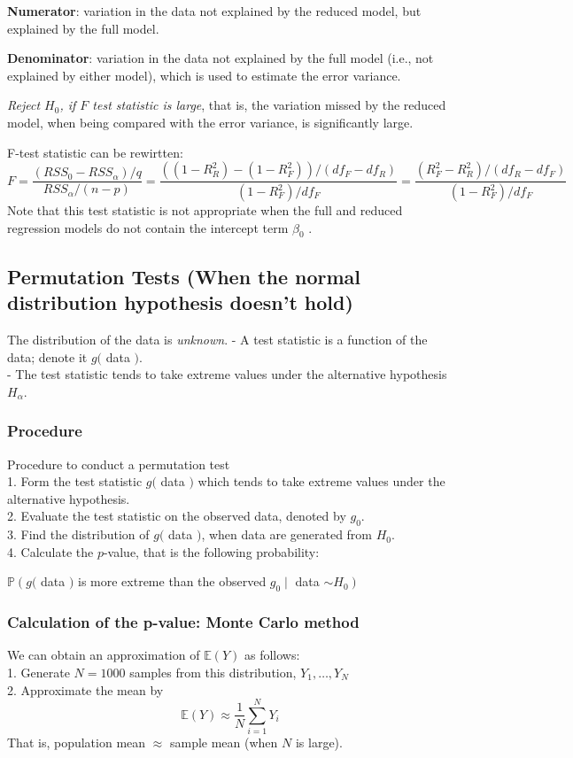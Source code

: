 \documentclass[11pt,a4paper]{article}
\begin{document}
\textbf{Numerator}: variation in the data not explained by the reduced model, but explained by the full model.

\textbf{Denominator}: variation in the data not explained by the full model (i.e., not explained by either model), which is used to estimate the error variance.

\textit{Reject $H_{0}$, if $F$ test statistic is large}, that is, the variation missed by the reduced model, when being compared with the error variance, is significantly large.

F-test statistic can be rewirtten:
$$F=\frac{\left(R S S_{0}-R S S_{\alpha}\right) / q}{R S S_{\alpha} /(n-p)}=\frac{((1-R_R^2)-(1-R_F^2))/(df_F-df_R)}{(1-R_F^2)/df_F}=\frac{(R_F^2-R_R^2)/(df_R-df_F)}{(1-R_F^2)/df_F}$$
Note that this test statistic is not appropriate when the full and reduced regression models do not contain the intercept term $\beta_0$ .

\subsection{Permutation Tests (When the normal distribution hypothesis doesn't hold)}
The distribution of the data is \textit{unknown}.
- A test statistic is a function of the data; denote it $g($ data $)$.\\
- The test statistic tends to take extreme values under the alternative hypothesis $H_{\alpha}$.
\subsubsection{Procedure}
Procedure to conduct a permutation test\\
1. Form the test statistic $g($ data $)$ which tends to take extreme values under the alternative hypothesis.\\
2. Evaluate the test statistic on the observed data, denoted by $g_{0}$.\\
3. Find the distribution of $g($ data $)$, when data are generated from $H_{0}$.\\
4. Calculate the $p$-value, that is the following probability:
\begin{center}
    $\mathbb{P}\left(g(\right.$ data $)$ is more extreme than the observed $g_{0} \mid$ data $\left.\sim H_{0}\right)$
\end{center}

\subsubsection{Calculation of the p-value: Monte Carlo method}
We can obtain an approximation of $\mathbb{E}(Y)$ as follows:\\
1. Generate $N=1000$ samples from this distribution, $Y_{1}, \ldots, Y_{N}$\\
2. Approximate the mean by
$$
\mathbb{E}(Y) \approx \frac{1}{N} \sum_{i=1}^{N} Y_{i}
$$
That is, population mean $\approx$ sample mean (when $N$ is large).\\
\end{document}
